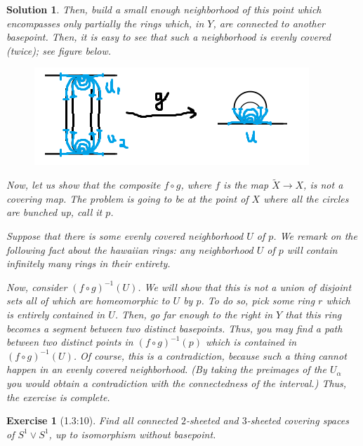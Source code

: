 \documentclass{article}
\theoremstyle{plain}
\newtheorem*{ex}{Exercise}
\theoremstyle{nonumberplain}
\newtheorem{sol}{Solution}
\begin{document}
\begin{sol}
Then, build a small enough neighborhood of this point which encompasses only partially the rings which, in $Y$, are connected to another basepoint. Then, it is easy to see that such a neighborhood is evenly covered (twice); see figure below.
\begin{figure}[H]
\centering
\includegraphics[width=0.8\linewidth]{rings3}
\end{figure}

Now, let us show that the composite $f \circ g$, where $f$ is the map $\tilde X \to X$, is not a covering map. The problem is going to be at the point of $X$ where all the circles are bunched up, call it $p$.

Suppose that there is some evenly covered neighborhood $U$ of $p$. We remark on the following fact about the hawaiian rings: \emph{any neighborhood $U$ of $p$ will contain infinitely many rings in their entirety.}

Now, consider $(f \circ g)^{-1}(U)$. We will show that this is not a union of disjoint sets all of which are homeomorphic to $U$ by $p$. To do so, pick some ring $r$ which is entirely contained in $U$. Then, go far enough to the right in $Y$ that this ring becomes a segment between two distinct basepoints. Thus, you may find a path between two distinct points in $(f \circ g)^{-1}(p)$ which is contained in $(f \circ g)^{-1}(U)$. Of course, this is a contradiction, because such a thing cannot happen in an evenly covered neighborhood. (By taking the preimages of the $U_\alpha$ you would obtain a contradiction with the connectedness of the interval.) Thus, the exercise is complete.
\end{sol}

\begin{ex}[1.3:10]
Find all connected $2$-sheeted and $3$-sheeted covering spaces of $S^1 \vee S^1$, up to isomorphism without basepoint.
\end{ex}
\end{document}
